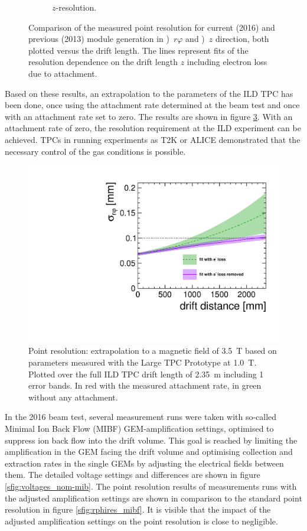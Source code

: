 \begin{figure}[tbhp!]
\begin{subfigure}[b]{0.48\textwidth}
\caption{$z$-resolution.}
\label{sfig:pres_13-16_z}
\end{subfigure}
\caption{Comparison of the measured point resolution for current (2016) and previous (2013) module generation in \protect{})~$r\varphi$ and \protect{})~$z$ direction, both plotted versus the drift length.
  The lines represent fits of the resolution dependence on the drift length $z$ including electron loss due to attachment.
}
\label{fig:pointresolution}
\end{figure}

Based on these results, an extrapolation to the parameters of the ILD TPC has been done, once using the attachment rate determined at the beam test and once with an attachment rate set to zero. 
The results are shown in figure \ref{fig:resextrapol}. 
With an attachment rate of zero, the resolution requirement at the ILD experiment can be achieved. 
TPCs in running experiments as T2K or ALICE demonstrated that the necessary control of the gas conditions is possible.

\begin{figure}[tbhp!]
    \centering
    \includegraphics[height=0.4\textwidth]{Tracker/TPC_Bonn/plots/TPC-DG_resolutionExtrapolation2016_v2.pdf}
    \caption{Point resolution: extrapolation to a magnetic field of \SI{3.5}{T} based on parameters measured with the Large TPC Prototype at \SI{1.0}{T}. Plotted over the full ILD TPC drift length of \SI{2.35}{m} including 1 \sigma error bands. In red with the measured attachment rate, in green without any attachment.}
    \label{fig:resextrapol}
\end{figure}

In the 2016 beam test, several measurement runs were taken with so-called Minimal Ion Back Flow (MIBF) GEM-amplification settings, optimised to suppress ion back flow into the drift volume.
This goal is reached by limiting the amplification in the GEM facing the drift volume and optimising collection and extraction rates in the single GEMs by adjusting the electrical fields between them.
The detailed voltage settings and differences are shown in figure \ref{sfig:voltages_nom-mib}. 
The point resolution results of measurements runs with the adjusted amplification settings are shown in comparison to the standard point resolution in figure \ref{sfig:rphires_mibf}. 
It is visible that the impact of the adjusted amplification settings on the point resolution is close to negligible.

